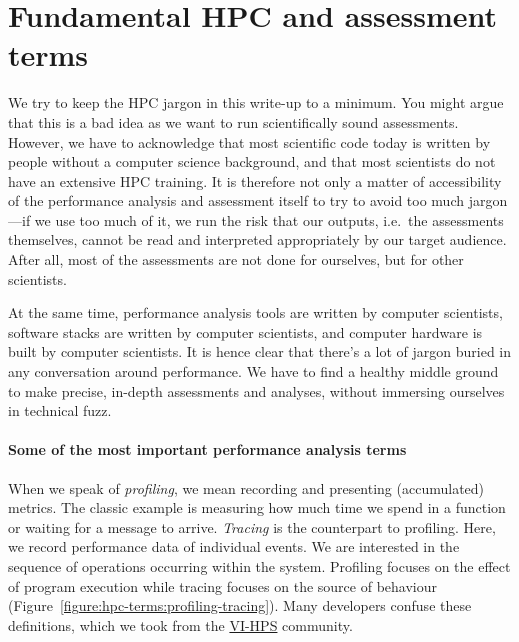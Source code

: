 \section{Fundamental HPC and assessment terms}
\label{section:terminology:hpc-terms}


We try to keep the HPC jargon in this write-up to a minimum.
You might argue that this is a bad idea as we want to run scientifically sound
assessments.
However, we have to acknowledge that most scientific code today is written by
people without a computer science background, and that most scientists do not
have an extensive HPC training.
It is therefore not only a matter of accessibility of the performance analysis
and assessment itself to try to avoid too much jargon---if we use too much of
it, we run the risk that our outputs, i.e.~the assessments themselves, cannot be
read and interpreted appropriately by our target audience.
After all, most of the assessments are not done for ourselves, but for other
scientists.


At the same time, performance analysis tools are written by computer scientists,
software stacks are written by computer scientists, and computer hardware is
built by computer scientists.
It is hence clear that there's a lot of jargon buried in any conversation around
performance. 
We have to find a healthy middle ground to make precise, in-depth assessments
and analyses, without immersing ourselves in technical fuzz.



\paragraph{Some of the most important performance analysis terms}

When we speak of \emph{profiling}, we mean recording and presenting (accumulated) metrics. 
The classic example is measuring how much time we spend in a function or waiting for a message to arrive. 
\emph{Tracing} is the counterpart to profiling. 
Here, we record performance data of individual events.
We are interested in the sequence of operations occurring within the system.
Profiling focuses on the effect of program execution while tracing focuses on
the source of behaviour (Figure~\ref{figure:hpc-terms:profiling-tracing}).
Many developers confuse these definitions, which we took from the \href{https://www.vi-hps.org/}{VI-HPS} community.


